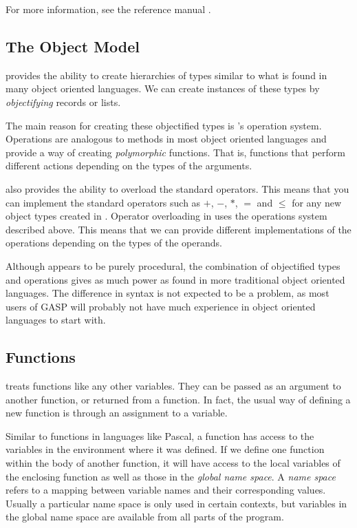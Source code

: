 For more information, see the \GAP{} reference manual \cite{gap-ref}.

\subsection{The \GAP{} Object Model}\label{sect:gap-object-model}

\GAP{} provides the ability to create hierarchies of types similar to what
is found in many object oriented languages.  We can create instances
of these types by \emph{objectifying} records or lists.

The main reason for creating these objectified types is \GAP{}'s
operation system.  Operations are analogous to methods in most object
oriented languages and provide a way of creating \emph{polymorphic}
functions.  That is, functions that perform different actions
depending on the types of the arguments.

\GAP{} also provides the ability to overload the standard operators.
This means that you can implement the standard operators such as $+$,
$-$, $*$, $=$ and $\le$ for any new object types created in \GAP{}.
Operator overloading in \GAP{} uses the operations system described
above.  This means that we can provide different implementations of
the operations depending on the types of the operands.

Although \GAP{} appears to be purely procedural, the combination of
objectified types and operations gives as much power as found in more
traditional object oriented languages.  The difference in syntax is
not expected to be a problem, as most users of GASP will probably not
have much experience in object oriented languages to start with.


\subsection{Functions}

\GAP{} treats functions like any other variables.  They can be passed as
an argument to another function, or returned from a function.  In
fact, the usual way of defining a new function is through an
assignment to a variable.

Similar to functions in languages like Pascal, a \GAP{} function has
access to the variables in the environment where it was defined.  If
we define one function within the body of another function, it will
have access to the local variables of the enclosing function as well
as those in the \emph{global name space}.  A \emph{name space} refers
to a mapping between variable names and their corresponding values.
Usually a particular name space is only used in certain contexts, but
variables in the global name space are available from all parts of the
program.

